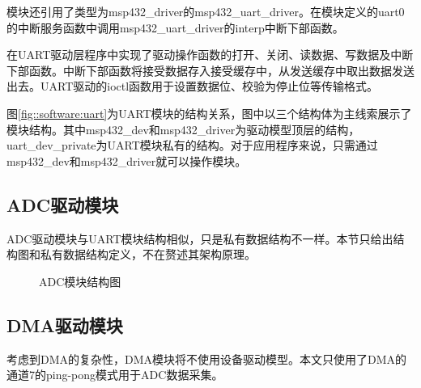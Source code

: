模块还引用了类型为msp432\_driver的msp432\_uart\_driver。在模块定义的uart0的中断服务函数中调用msp432\_uart\_driver的interp中断下部函数。

在UART驱动层程序中实现了驱动操作函数的打开、关闭、读数据、写数据及中断下部函数。中断下部函数将接受数据存入接受缓存中，从发送缓存中取出数据发送出去。UART驱动的ioctl函数用于设置数据位、校验为停止位等传输格式。

图\ref{fig::software:uart}为UART模块的结构关系，图中以三个结构体为主线索展示了模块结构。其中msp432\_dev和msp432\_driver为驱动模型顶层的结构，uart\_dev\_private为UART模块私有的结构。对于应用程序来说，只需通过msp432\_dev和msp432\_driver就可以操作模块。


%
\subsection{ADC驱动模块}
ADC驱动模块与UART模块结构相似，只是私有数据结构不一样。本节只给出结构图和私有数据结构定义，不在赘述其架构原理。
\begin{figure}[!htbp]
	\centering
	
	\caption{ADC模块结构图}
	\label{fig::software:adc}
\end{figure}

\subsection{DMA驱动模块}
考虑到DMA的复杂性，DMA模块将不使用设备驱动模型。本文只使用了DMA的通道7的ping-pong模式用于ADC数据采集。

